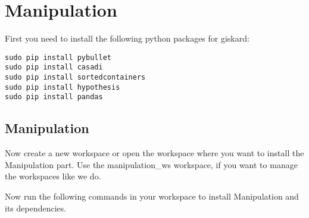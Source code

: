 \documentclass[main.tex]{subfiles}
\begin{document}
\section{Manipulation}
\label{sec:Manipulation}

First you need to install the following python packages for giskard:\\

\begin{lstlisting}
sudo pip install pybullet
sudo pip install casadi
sudo pip install sortedcontainers
sudo pip install hypothesis
sudo pip install pandas
\end{lstlisting}
	
	\subsection{Manipulation}
Now create a new workspace or open the workspace where you want to install the Manipulation part. Use the manipulation\_ws workspace, if you want to manage the workspaces like we do.


Now run the following commands in your workspace to install Manipulation and its dependencies.\\	

\begin{mdframed}[backgroundcolor=mygray, rightline=false]

\end{mdframed}
	
	
\end{document}
